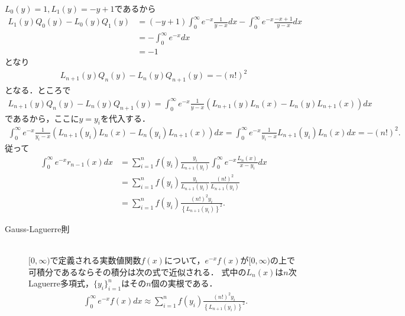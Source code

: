 \documentclass[a4j,papersize,disablejfam,slide,14pt]{jsarticle}
\def\exp#1{e^{#1}} %
\begin{document}
    $L_0(y)=1, L_1(y)=-y+1$であるから
    \begin{align}
    	L_1(y) Q_0(y) - L_0(y) Q_1(y) &= (-y+1) \int_{0}^{\infty} \exp{-x} \frac{1}{y-x} dx - \int_{0}^{\infty} \exp{-x} \frac{-x+1}{y-x} dx \\
        &= - \int_{0}^{\infty} \exp{-x} dx \\
        &= -1
    \end{align}
    となり
    \begin{align}
    	L_{n+1}(y) Q_n(y) - L_n(y) Q_{n+1}(y) = -(n!)^2
    \end{align}
    となる．ところで
    \begin{align}
    	L_{n+1}(y) Q_n(y) - L_n(y) Q_{n+1}(y) = \int_{0}^{\infty} \exp{-x} \frac{1}{y-x} \left( L_{n+1}(y)L_n(x) - L_n(y)L_{n+1}(x) \right) dx
    \end{align}
    であるから，ここに$y=y_i$を代入する．
    \begin{align}
    	\int_{0}^{\infty} \exp{-x} \frac{1}{y_i-x} \left( L_{n+1}(y_i)L_n(x) - L_n(y_i)L_{n+1}(x) \right) dx 
        = \int_{0}^{\infty} \exp{-x} \frac{1}{y_i-x} L_{n+1}(y_i)L_n(x) dx = -(n!)^2.
    \end{align}
    従って
    \begin{align}
    	\int_{0}^{\infty} \exp{-x} r_{n-1}(x) dx
        &= \sum_{i=1}^{n} f(y_i) \frac{y_i}{L_{n+1}(y_i)} \int_{0}^{\infty} \exp{-x} \frac{L_n(x)}{x-y_i}dx \\
        &= \sum_{i=1}^{n} f(y_i) \frac{y_i}{L_{n+1}(y_i)} \frac{(n!)^2}{L_{n+1}(y_i)} \\
        &= \sum_{i=1}^{n} f(y_i) \frac{(n!)^2 y_i}{\left\{L_{n+1}(y_i)\right\}^2}.
    \end{align}
    
    \begin{screen}
    \begin{description}
    	\item[{\rm Gauss-Laguerre}則]\mbox{}\\
        $[0, \infty)$で定義される実数値関数$f(x)$について，$\exp{-x}f(x)$が$[0, \infty)$の上で可積分であるならその積分は次の式で近似される．
        式中の$L_n(x)$は$n$次{\rm Laguerre}多項式，$\{y_i\}_{i=1}^{n}$はその$n$個の実根である．
    		\begin{align}
    			\int_{0}^{\infty} \exp{-x} f(x) dx \approx \sum_{i=1}^{n} f(y_i) \frac{(n!)^2 y_i}{\left\{L_{n+1}(y_i)\right\}^2}.
    		\end{align}
    \end{description}
    \end{screen}
    
\end{document}
